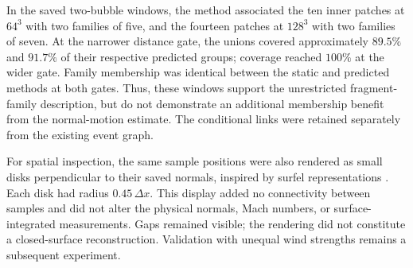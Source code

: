 In the saved two-bubble windows, the method associated the ten inner patches
at $64^3$ with two families of five, and the fourteen patches at $128^3$ with
two families of seven. At the narrower distance gate, the unions covered
approximately $89.5\%$ and $91.7\%$ of their respective predicted groups;
coverage reached $100\%$ at the wider gate. Family membership was identical
between the static and predicted methods at both gates. Thus, these windows
support the unrestricted fragment-family description, but do not demonstrate
an additional membership benefit from the normal-motion estimate. The
conditional links were retained separately from the existing event graph.

For spatial inspection, the same sample positions were also rendered as
small disks perpendicular to their saved normals, inspired by surfel
representations \cite{Pfister2000}. Each disk had radius $0.45\,\Delta x$.
This display added no connectivity between samples and did not alter the
physical normals, Mach numbers, or surface-integrated measurements. Gaps
remained visible; the rendering did not constitute a closed-surface
reconstruction. Validation with unequal wind strengths remains a subsequent
experiment.
